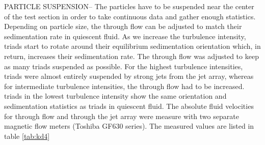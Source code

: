 \documentclass[]{jfm}
\begin{document}
PARTICLE SUSPENSION--  The particles have to be suspended near the center of the test section in order to take continuous data and gather enough statistics. Depending on particle size, the through flow can be adjusted to match their sedimentation rate in quiescent fluid.  As we increase the turbulence intensity, triads start to rotate around their equilibrium sedimentation orientation which, in return, increases their sedimentation rate.  The through flow was adjusted to keep as many triads suspended as possible.  For the highest turbulence intensities, triads were almost entirely suspended by strong jets from the jet array, whereas for intermediate turbulence intensities, the through flow had to be increased. triads in the lowest turbulence intensity show the same orientation and sedimentation statistics as triads in quiescent fluid.  The absolute fluid velocities for through flow and through the jet array were measure with two separate magnetic flow meters (Toshiba GF630 series).  The measured values are listed in table \ref{tab:kd4}
\end{document}
